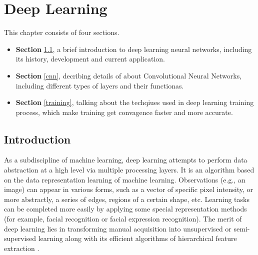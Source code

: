 \chapter{Deep Learning}
\label{cp:dp}
This chapter consists of four sections. 
\begin{itemize}
    \item \textbf{Section} \ref{dpintro}, a brief introduction to deep learning neural networks, including its history, development and current application.
    \item \textbf{Section} \ref{cnn}, decribing details of about Convolutional Neural Networks, including different types of layers and their functionas.
    \item \textbf{Section} \ref{training}, talking about the techqiues used in deep learning training process, which make training get convagence faster and more accurate.  
\end{itemize} 

\section{Introduction}
    \label{dpintro}
    As a subdiscipline of machine learning, deep learning attempts to perform data abstraction at a high level via multiple processing layers. It is an algorithm based on the data representation learning of machine learning. Observations (e.g., an image) can appear in various forms, such as a vector of specific pixel intensity, or more abstractly, a series of edges, regions of a certain shape, etc. Learning tasks can be completed more easily by applying some special representation methods (for example, facial recognition or facial expression recognition). The merit of deep learning lies in transforming manual acquisition into unsupervised or semi-supervised learning along with its efficient algorithms of hierarchical feature extraction \cite{schmidhuber2015deep}.

